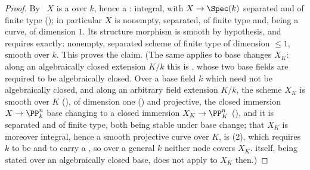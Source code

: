 %
\begin{proof}
By\  $X$ is a
 over $k$, hence a
: integral, with
$X\to\Spec(k)$ separated and of finite type (); in
particular $X$ is nonempty, separated, of finite type and, being a
curve, of dimension $1$.  Its structure morphism is smooth by hypothesis,
and
 requires exactly: nonempty, separated scheme of
finite type of dimension $\le1$, smooth over $k$.  This proves the
claim.  (The same applies to base changes $X_K$: along an algebraically
closed extension $K/k$ this is , whose
two base fields are required to be algebraically closed.  Over a base
field $k$ which need not be algebraically closed, and along an arbitrary
field extension $K/k$, the scheme $X_K$ is smooth over $K$
(), of dimension one
() and projective, the closed
immersion $X\to\PP^n_k$ base changing to a closed immersion
$X_K\to\PP^n_K$ (), and it is
separated and of finite type, both being stable under base change; that
$X_K$ is moreover integral, hence a smooth projective curve over $K$, is
(2), which requires $k$ to be
 and to carry a
, so over a general
$k$ neither node covers $X_K$.   itself, being
stated over an algebraically closed base, does not apply to $X_K$
then.)
\end{proof}

